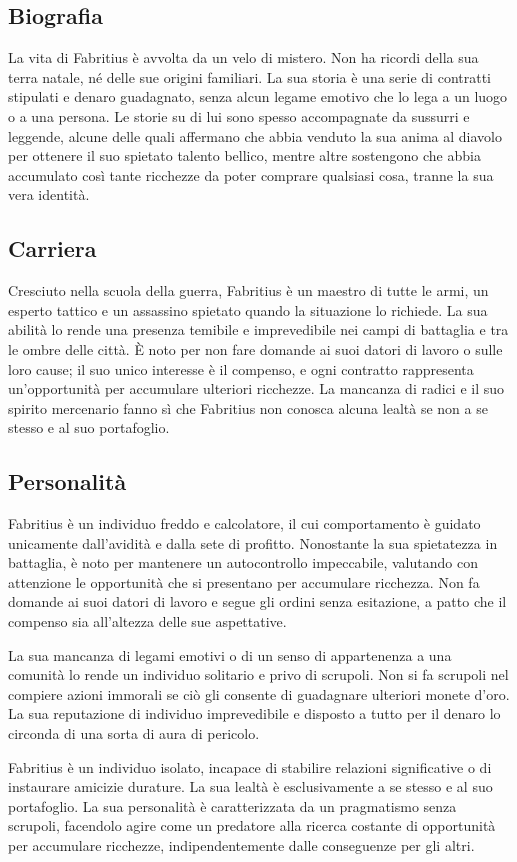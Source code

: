 \subsection{Biografia}\label{biografia}


La vita di Fabritius è avvolta da un velo di mistero. Non ha ricordi
della sua terra natale, né delle sue origini familiari. La sua storia è
una serie di contratti stipulati e denaro guadagnato, senza alcun legame
emotivo che lo lega a un luogo o a una persona. Le storie su di lui sono
spesso accompagnate da sussurri e leggende, alcune delle quali affermano
che abbia venduto la sua anima al diavolo per ottenere il suo spietato
talento bellico, mentre altre sostengono che abbia accumulato così tante
ricchezze da poter comprare qualsiasi cosa, tranne la sua vera identità.

\subsection{Carriera}\label{carriera}


Cresciuto nella scuola della guerra, Fabritius è un maestro di tutte le
armi, un esperto tattico e un assassino spietato quando la situazione lo
richiede. La sua abilità lo rende una presenza temibile e imprevedibile
nei campi di battaglia e tra le ombre delle città. È noto per non fare
domande ai suoi datori di lavoro o sulle loro cause; il suo unico
interesse è il compenso, e ogni contratto rappresenta un'opportunità per
accumulare ulteriori ricchezze. La mancanza di radici e il suo spirito
mercenario fanno sì che Fabritius non conosca alcuna lealtà se non a se
stesso e al suo portafoglio.

\subsection{Personalità}\label{personalituxe0}


Fabritius è un individuo freddo e calcolatore, il cui comportamento è
guidato unicamente dall'avidità e dalla sete di profitto. Nonostante la
sua spietatezza in battaglia, è noto per mantenere un autocontrollo
impeccabile, valutando con attenzione le opportunità che si presentano
per accumulare ricchezza. Non fa domande ai suoi datori di lavoro e
segue gli ordini senza esitazione, a patto che il compenso sia
all'altezza delle sue aspettative.

La sua mancanza di legami emotivi o di un senso di appartenenza a una
comunità lo rende un individuo solitario e privo di scrupoli. Non si fa
scrupoli nel compiere azioni immorali se ciò gli consente di guadagnare
ulteriori monete d'oro. La sua reputazione di individuo imprevedibile e
disposto a tutto per il denaro lo circonda di una sorta di aura di
pericolo.

Fabritius è un individuo isolato, incapace di stabilire relazioni
significative o di instaurare amicizie durature. La sua lealtà è
esclusivamente a se stesso e al suo portafoglio. La sua personalità è
caratterizzata da un pragmatismo senza scrupoli, facendolo agire come un
predatore alla ricerca costante di opportunità per accumulare ricchezze,
indipendentemente dalle conseguenze per gli altri.

